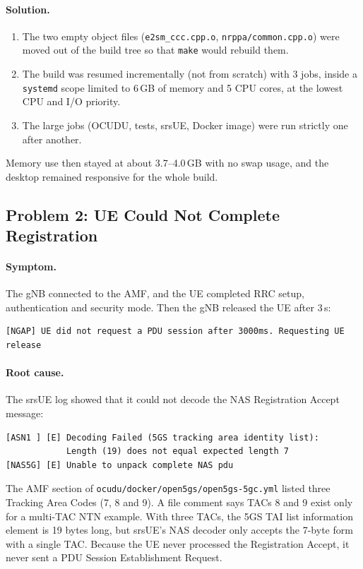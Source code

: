 \documentclass[11pt,a4paper]{article}
\newcommand{\fpath}[1]{\texttt{#1}}
\begin{document}
\paragraph{Solution.}
\begin{enumerate}[itemsep=2pt]
  \item The two empty object files
        (\fpath{e2sm\_ccc.cpp.o}, \fpath{nrppa/common.cpp.o}) were moved out of
        the build tree so that \texttt{make} would rebuild them.
  \item The build was resumed incrementally (not from scratch) with 3 jobs,
        inside a \texttt{systemd} scope limited to 6\,GB of memory and 5 CPU
        cores, at the lowest CPU and I/O priority.
  \item The large jobs (OCUDU, tests, srsUE, Docker image) were run strictly
        one after another.
\end{enumerate}
Memory use then stayed at about 3.7--4.0\,GB with no swap usage, and the
desktop remained responsive for the whole build.

\subsection{Problem 2: UE Could Not Complete Registration}
\label{sec:p2}

\paragraph{Symptom.} The gNB connected to the AMF, and the UE completed RRC
setup, authentication and security mode. Then the gNB released the UE after
3\,s:
\begin{lstlisting}
[NGAP] UE did not request a PDU session after 3000ms. Requesting UE release
\end{lstlisting}

\paragraph{Root cause.} The srsUE log showed that it could not decode the NAS
Registration Accept message:
\begin{lstlisting}
[ASN1 ] [E] Decoding Failed (5GS tracking area identity list):
            Length (19) does not equal expected length 7
[NAS5G] [E] Unable to unpack complete NAS pdu
\end{lstlisting}
The AMF section of \fpath{ocudu/docker/open5gs/open5gs-5gc.yml} listed three
Tracking Area Codes (7, 8 and 9). A file comment says TACs 8 and 9 exist only
for a multi-TAC NTN example. With three TACs, the 5GS TAI list information
element is 19 bytes long, but srsUE's NAS decoder only accepts the 7-byte form
with a single TAC. Because the UE never processed the Registration Accept, it
never sent a PDU Session Establishment Request.
\end{document}
